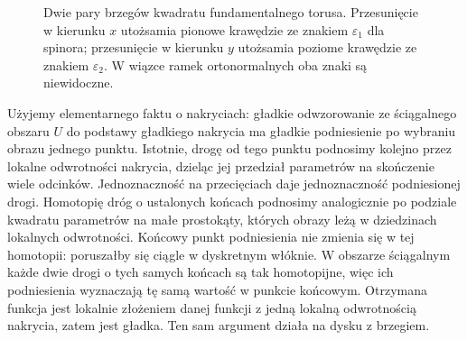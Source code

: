 \begin{figure}[!htbp]
\centering
{}
\caption{Dwie pary brzegów kwadratu fundamentalnego torusa.
Przesunięcie w kierunku $x$ utożsamia pionowe krawędzie
ze znakiem $\varepsilon_1$ dla spinora; przesunięcie w kierunku
$y$ utożsamia poziome krawędzie ze znakiem $\varepsilon_2$.
W wiązce ramek ortonormalnych oba znaki są niewidoczne.}
\label{fig:lin31-spin-torus-signs}
\end{figure}

\begin{uwaga}
\label{rem:lin31-spin-podnoszenie}
Użyjemy elementarnego faktu o nakryciach: gładkie odwzorowanie
ze ściągalnego obszaru $U$ do podstawy gładkiego nakrycia ma
gładkie podniesienie po wybraniu obrazu jednego punktu.
Istotnie, drogę od tego punktu podnosimy kolejno przez lokalne
odwrotności nakrycia, dzieląc jej przedział parametrów na skończenie
wiele odcinków. Jednoznaczność na przecięciach daje jednoznaczność
podniesionej drogi. Homotopię dróg o ustalonych końcach podnosimy
analogicznie po podziale kwadratu parametrów na małe prostokąty,
których obrazy leżą w dziedzinach lokalnych odwrotności.
Końcowy punkt podniesienia nie zmienia się w tej homotopii:
poruszałby się ciągle w dyskretnym włóknie. W obszarze ściągalnym
każde dwie drogi o tych samych końcach są tak homotopijne,
więc ich podniesienia wyznaczają tę samą wartość w punkcie końcowym.
Otrzymana funkcja jest lokalnie złożeniem danej funkcji z jedną
lokalną odwrotnością nakrycia, zatem jest gładka.
Ten sam argument działa na dysku z brzegiem.
\end{uwaga}

